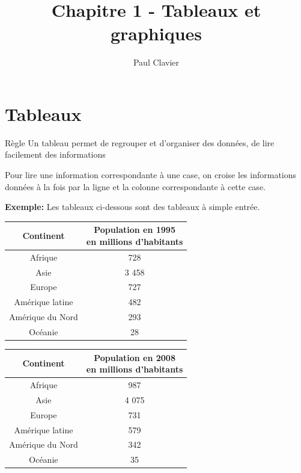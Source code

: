 \documentclass[12pt,a4paper]{article}
\author{Paul Clavier}
\title{Chapitre 1 - Tableaux et graphiques}
\begin{document}
\renewcommand\thesection{\Roman{section}}
\renewcommand\thesubsection{\arabic{subsection}}


\begin{center}
\end{center}

\section{Tableaux}

\begin{definition}{Règle}
Un tableau permet de regrouper et d’organiser des données, de lire facilement des informations

Pour lire une information correspondante à une case, on croise les informations données à la fois par la ligne et la colonne correspondante à cette case.
\end{definition}

\textbf{Exemple:} Les tableaux ci-dessous sont des tableaux à simple entrée.

\begin{multicols}{2}
\begin{tabular}{|c|c|}
\hline \rowcolor{lightgray}
Continent & \thead{Population en 1995\\en millions d'habitants} \\ \hline
Afrique & 728 \\ \hline
Asie & 3 458 \\ \hline
Europe & 727 \\ \hline
Amérique latine & 482 \\ \hline
Amérique du Nord & 293 \\ \hline
Océanie & 28 \\ \hline
\end{tabular}

\begin{tabular}{|c|c|}
\hline \rowcolor{lightgray}
Continent & \thead{Population en 2008\\en millions d'habitants} \\ \hline
Afrique & 987 \\ \hline
Asie & 4 075 \\ \hline
Europe & 731 \\ \hline
Amérique latine & 579 \\ \hline
Amérique du Nord & 342 \\ \hline
Océanie & 35 \\ \hline
\end{tabular}
\end{multicols}
\end{document}
